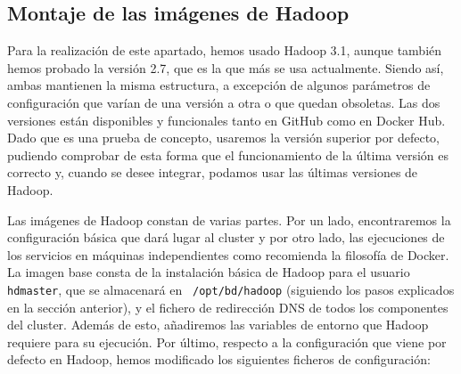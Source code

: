 \subsection{Montaje de las imágenes de Hadoop\label{montHadoop}}

Para la realización de este apartado, hemos usado Hadoop 3.1, aunque
también hemos probado la versión 2.7, que es la que más se usa actualmente.
Siendo así, ambas mantienen la misma estructura, a excepción de algunos
parámetros de configuración que varían de una versión a otra o que quedan
obsoletas. Las dos versiones están disponibles y funcionales tanto en
GitHub como en Docker Hub. Dado que es una prueba de concepto, usaremos la
versión superior por defecto, pudiendo comprobar de esta forma que el
funcionamiento de la última versión es correcto y, cuando se desee
integrar, podamos usar las últimas versiones de Hadoop.

Las imágenes de Hadoop constan de varias partes. Por un lado, encontraremos
la configuración básica que dará lugar al cluster y por otro lado, las
ejecuciones de los servicios en máquinas independientes como recomienda la
filosofía de Docker. La imagen base consta de la instalación básica de
Hadoop para el usuario {\tt hdmaster}, que se almacenará en {\tt
  /opt/bd/hadoop} (siguiendo los pasos explicados en la sección anterior),
y el fichero de redirección DNS de todos los componentes del cluster.
Además de esto, añadiremos las variables de entorno que Hadoop requiere
para su ejecución.%
Por último, respecto a la configuración que viene por defecto en Hadoop,
hemos modificado los siguientes ficheros de configuración:

